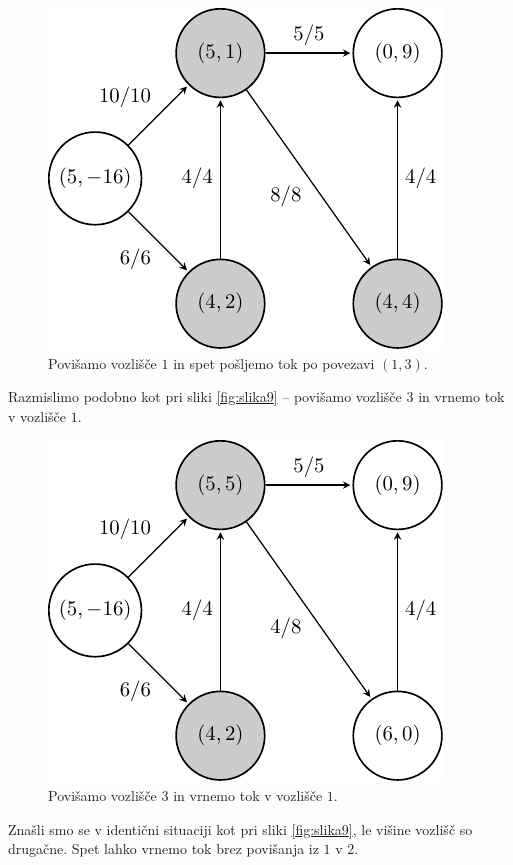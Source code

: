 \documentclass[mat1]{fmfdelo}
\begin{document}
\begin{figure}[H]
  \centering
  \includegraphics{images/graf2-12.pdf}
  \caption{Povišamo vozlišče $1$ in spet pošljemo tok po povezavi $(1,3)$.}
\end{figure}

Razmislimo podobno kot pri sliki \ref{fig:slika9} -- povišamo vozlišče $3$ in vrnemo tok v vozlišče $1$.

\begin{figure}[H]
  \centering
  \includegraphics{images/graf2-13.pdf}
  \caption{Povišamo vozlišče $3$ in vrnemo tok v vozlišče $1$.}
\end{figure}

Znašli smo se v identični situaciji kot pri sliki \ref{fig:slika9}, le višine vozlišč so drugačne. Spet lahko vrnemo tok brez povišanja
iz $1$ v $2$.
\end{document}
